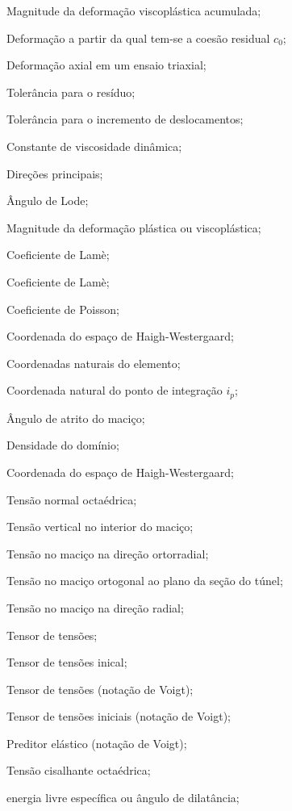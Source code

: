 \item[$\bar{\varepsilon}^{vp}$] Magnitude da deformação viscoplástica acumulada;
\item[$ \varepsilon_I $] Deformação a partir da qual tem-se a coesão residual $c_0$;
\item[$ \varepsilon_a $] Deformação axial em um ensaio triaxial;
\item[$ \varepsilon_R $] Tolerância para o resíduo;
\item[$ \varepsilon_u $] Tolerância para o incremento de deslocamentos;

\item[$ \eta $] 		Constante de viscosidade dinâmica;
\item[$\eta_1,\eta_2,\eta_3$] 	Direções principais;
\item[$ \theta $] 		Ângulo de Lode;
\item[$\lambda$] 	Magnitude da deformação plástica ou viscoplástica;
\item[$\lambda^e$] 	Coeficiente de Lamè;
\item[$\mu^e$] 	Coeficiente de Lamè;
\item[$ \nu $] 			Coeficiente de Poisson;
\item[$ \xi_{H} $] 				Coordenada do espaço de Haigh-Westergaard;
\item[$\underline \xi$] 				Coordenadas naturais do elemento;
\item[$\xil_{i_p}$] 				Coordenada natural do ponto de integração $i_p$;


\item[$ \phi $] 		Ângulo de atrito do maciço;
\item[$ \rho $] 		Densidade do domínio;
\item[$ \rho_{H} $] 		Coordenada do espaço de Haigh-Westergaard;

\item[$ \sigma_{oct} $] 	Tensão normal octaédrica;
\item[$ \sigma_{v} $] 	Tensão vertical no interior do maciço;
\item[$ \sigma_{\theta \theta} $] Tensão no maciço na direção ortorradial;
\item[$ \sigma_{zz} $] 	Tensão no maciço ortogonal ao plano da seção do túnel;
\item[$ \sigma_{rr} $] 	Tensão no maciço na direção radial;
\item[$ \sigmall $] 	Tensor de tensões;
\item[$ \sigmall_I $] 	Tensor de tensões inical;
\item[$ \sigmal $] 	Tensor de tensões (notação de Voigt);
\item[$ \sigmal_I $] 	Tensor de tensões iniciais (notação de Voigt);
\item[$ \sigmal^{trial} $] 	Preditor elástico (notação de Voigt);
\item[$ \tau_{oct} $] 	Tensão cisalhante octaédrica;
\item[$\psi$] energia livre específica ou ângulo de dilatância;

